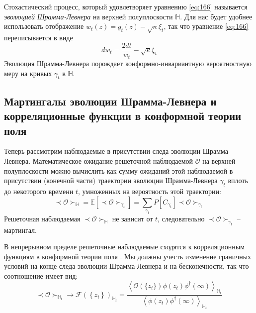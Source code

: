 Стохастический процесс, который удовлетворяет уравнению \eqref{eq:166} называется {\it эволюцией Шрамма-Левнера} на верхней полуплоскости $\mathbb{H}$. Для нас будет удобнее использовать отображение $w_{t} (z)=g_{t}(z)-\sqrt{\kappa}\xi_{t}$, так что уравнение \eqref{eq:166} переписывается в виде
\begin{equation}
  \label{eq:120}
       d w _{t}= \frac{2dt}{w_{t} }-\sqrt{\kappa}\xi_{t}  
\end{equation}
Эволюция Шрамма-Левнера порождает конформно-инвариантную вероятностную меру на кривых $\gamma_{t}$ в $\mathbb{H}$.

\subsection{Мартингалы эволюции Шрамма-Левнера и корреляционные функции в конформной теории поля}
\label{sec:corr-betw-sle}

Теперь рассмотрим наблюдаемые в присутствии следа эволюции Шрамма-Левнера. Математическое ожидание решеточной наблюдаемой $\mathcal{O}$ на верхней полуплоскости можно вычислить как сумму ожиданий этой наблюдаемой в присутствии (конечной части) траектории эволюции Шрамма-Левнера  $\gamma_{t}$ вплоть до некоторого времени $t$, умноженных на вероятность этой траектории:
\begin{equation*}
  \prec \mathcal{O} \succ_{\mathbb{H}}=\mathbb{E}\left[\prec\mathcal{O}\succ_{\gamma_{t}}\right]=\sum_{\gamma_{t}} P\left[C_{\gamma_{t}}\right] \prec \mathcal{O} \succ_{\gamma_{t}}
\end{equation*}
Решеточная наблюдаемая  $\prec \mathcal{O} \succ_{\mathbb{H}}$ не зависит от  $t$, следовательно $\prec\mathcal{O}\succ_{\gamma_{t}}$ -- мартингал.

В непрерывном пределе решеточные наблюдаемые сходятся к корреляционным функциям в конформной теории поля \cite{bauer2003sle,bauer2003conformal,bauer2002sle}. Мы должны учесть изменение граничных условий на конце следа эволюции Шрамма-Левнера и на бесконечности, так что соотношение имеет вид:
\begin{equation}
  \prec \mathcal{O} \succ_{\mathbb{H}_{t}}\to \mathcal{F}(\left\{z_{i}\right\})_{\mathbb{H}_{t}}=
  \frac{\left< \mathcal{O}(\{z_{i}\})\phi(z_{t})\phi^{\dagger}(\infty)\right>_{\mathbb{H}_{t}}}{\left<\phi(z_{t})\phi^{\dagger}(\infty)\right>_{\mathbb{H}_{t}}}
\label{eq:162}
\end{equation}

